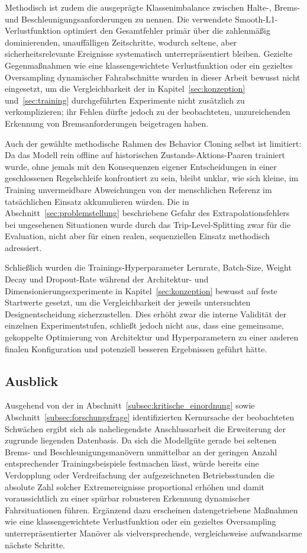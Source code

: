Methodisch ist zudem die ausgeprägte Klassenimbalance zwischen Halte-, Brems- und Beschleunigungsanforderungen zu nennen. Die verwendete Smooth-L1-Verlustfunktion optimiert den Gesamtfehler primär über die zahlenmäßig dominierenden, unauffälligen Zeitschritte, wodurch seltene, aber sicherheitsrelevante Ereignisse systematisch unterrepräsentiert bleiben. Gezielte Gegenmaßnahmen wie eine klassengewichtete Verlustfunktion oder ein gezieltes Oversampling dynamischer Fahrabschnitte wurden in dieser Arbeit bewusst nicht eingesetzt, um die Vergleichbarkeit der in Kapitel~\ref{sec:konzeption} und~\ref{sec:training} durchgeführten Experimente nicht zusätzlich zu verkomplizieren; ihr Fehlen dürfte jedoch zu der beobachteten, unzureichenden Erkennung von Bremsanforderungen beigetragen haben.

Auch der gewählte methodische Rahmen des Behavior Cloning selbst ist limitiert: Da das Modell rein offline auf historischen Zustands-Aktions-Paaren trainiert wurde, ohne jemals mit den Konsequenzen eigener Entscheidungen in einer geschlossenen Regelschleife konfrontiert zu sein, bleibt unklar, wie sich kleine, im Training unvermeidbare Abweichungen von der menschlichen Referenz im tatsächlichen Einsatz akkumulieren würden. Die in Abschnitt~\ref{sec:problemstellung} beschriebene Gefahr des Extrapolationsfehlers bei ungesehenen Situationen wurde durch das Trip-Level-Splitting zwar für die Evaluation, nicht aber für einen realen, sequenziellen Einsatz methodisch adressiert.

Schließlich wurden die Trainings-Hyperparameter Lernrate, Batch-Size, Weight Decay und Dropout-Rate während der Architektur- und Dimensionierungsexperimente in Kapitel~\ref{sec:konzeption} bewusst auf feste Startwerte gesetzt, um die Vergleichbarkeit der jeweils untersuchten Designentscheidung sicherzustellen. Dies erhöht zwar die interne Validität der einzelnen Experimentstufen, schließt jedoch nicht aus, dass eine gemeinsame, gekoppelte Optimierung von Architektur und Hyperparametern zu einer anderen finalen Konfiguration und potenziell besseren Ergebnissen geführt hätte.

\subsection{Ausblick}

Ausgehend von der in Abschnitt~\ref{subsec:kritische_einordnung} sowie Abschnitt~\ref{subsec:forschungsfrage} identifizierten Kernursache der beobachteten Schwächen ergibt sich als naheliegendste Anschlussarbeit die Erweiterung der zugrunde liegenden Datenbasis. Da sich die Modellgüte gerade bei seltenen Brems- und Beschleunigungsmanövern unmittelbar an der geringen Anzahl entsprechender Trainingsbeispiele festmachen lässt, würde bereits eine Verdopplung oder Verdreifachung der aufgezeichneten Betriebsstunden die absolute Zahl solcher Extremereignisse proportional erhöhen und damit voraussichtlich zu einer spürbar robusteren Erkennung dynamischer Fahrsituationen führen. Ergänzend dazu erscheinen datengetriebene Maßnahmen wie eine klassengewichtete Verlustfunktion oder ein gezieltes Oversampling unterrepräsentierter Manöver als vielversprechende, vergleichsweise aufwandsarme nächste Schritte.

